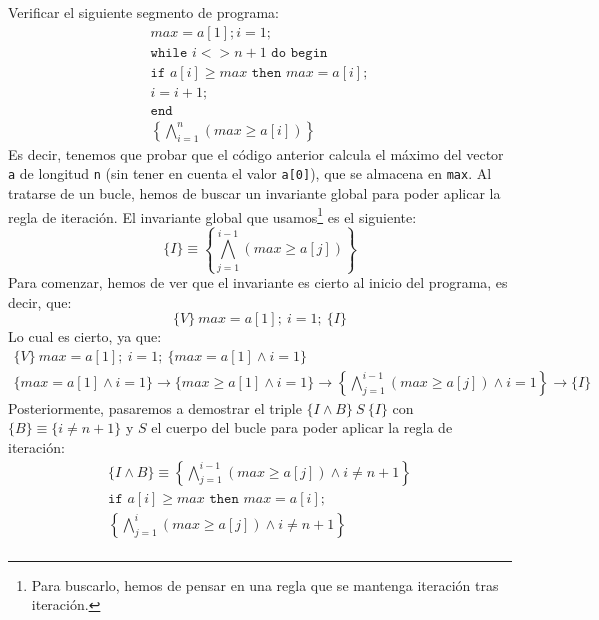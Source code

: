 \begin{ejercicio}\label{ej_rel1_44}
    Verificar el siguiente segmento de programa:
    \begin{gather*}
        max = a[1]; i = 1; \\
        \texttt{while\ } i <> n+1 \texttt{\ do\ begin} \\
        \texttt{if\ } a[i] \geq max \texttt{\ then\ } max = a[i];\\
        i=i+1; \\
        \texttt{end} \\
        \left\{\bigwedge_{i=1}^n (max \geq a[i])\right\}
    \end{gather*}
    Es decir, tenemos que probar que el código anterior calcula el máximo del vector \verb|a| de longitud \verb|n| (sin tener en cuenta el valor \verb|a[0]|), que se almacena en \verb|max|. Al tratarse de un bucle, hemos de buscar un invariante global para poder aplicar la regla de iteración. El invariante global que usamos\footnote{Para buscarlo, hemos de pensar en una regla que se mantenga iteración tras iteración.} es el siguiente:
    \begin{equation*}
        \{I\} \equiv \left\{\bigwedge_{j=1}^{i-1} (max \geq a[j])\right\}
    \end{equation*}
    Para comenzar, hemos de ver que el invariante es cierto al inicio del programa, es decir, que:
    \begin{equation*}
        \{V\}\ max = a[1];\ i=1;\ \{I\}
    \end{equation*}
    Lo cual es cierto, ya que:
    \begin{gather*}
        \{V\}\ max=a[1];\ i=1;\ \{max = a[1] \land i = 1\} \\ 
        \{max = a[1] \land i = 1\}\rightarrow \{max \geq a[1] \land i=1\} \rightarrow \left\{\bigwedge_{j=1}^{i-1} (max \geq a[j]) \land i = 1\right\} \rightarrow \{I\}
    \end{gather*}
    Posteriormente, pasaremos a demostrar el triple $\{I \land B\}\ S\ \{I\}$ con $\{B\} \equiv \{i\neq n+1\}$ y $S$ el cuerpo del bucle para poder aplicar la regla de iteración:
    \begin{gather*}
        \{I \land B\} \equiv \left\{\bigwedge_{j=1}^{i-1} (max \geq a[j]) \land i\neq n+1\right\} \\
        \texttt{if\ } a[i] \geq max \texttt{\ then\ } max = a[i];\\
        \left\{\bigwedge_{j=1}^{i} (max \geq a[j]) \land i\neq n+1\right\} \\

\end{gather*}
\end{ejercicio}
